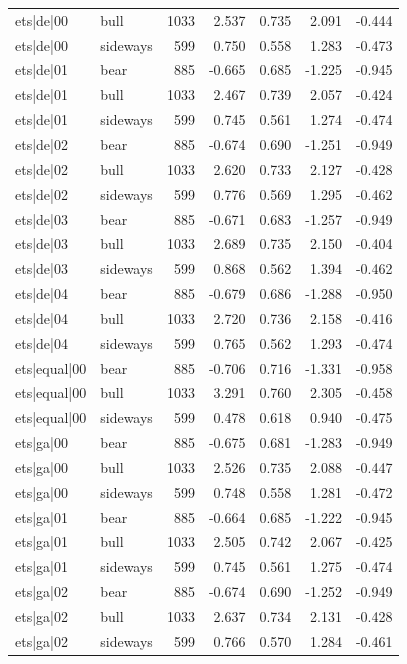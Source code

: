 \begin{table}
\begin{tabular}{llrrrrr}
ets|de|00 & bull & 1033 & 2.537 & 0.735 & 2.091 & -0.444 \\
ets|de|00 & sideways & 599 & 0.750 & 0.558 & 1.283 & -0.473 \\
ets|de|01 & bear & 885 & -0.665 & 0.685 & -1.225 & -0.945 \\
ets|de|01 & bull & 1033 & 2.467 & 0.739 & 2.057 & -0.424 \\
ets|de|01 & sideways & 599 & 0.745 & 0.561 & 1.274 & -0.474 \\
ets|de|02 & bear & 885 & -0.674 & 0.690 & -1.251 & -0.949 \\
ets|de|02 & bull & 1033 & 2.620 & 0.733 & 2.127 & -0.428 \\
ets|de|02 & sideways & 599 & 0.776 & 0.569 & 1.295 & -0.462 \\
ets|de|03 & bear & 885 & -0.671 & 0.683 & -1.257 & -0.949 \\
ets|de|03 & bull & 1033 & 2.689 & 0.735 & 2.150 & -0.404 \\
ets|de|03 & sideways & 599 & 0.868 & 0.562 & 1.394 & -0.462 \\
ets|de|04 & bear & 885 & -0.679 & 0.686 & -1.288 & -0.950 \\
ets|de|04 & bull & 1033 & 2.720 & 0.736 & 2.158 & -0.416 \\
ets|de|04 & sideways & 599 & 0.765 & 0.562 & 1.293 & -0.474 \\
ets|equal|00 & bear & 885 & -0.706 & 0.716 & -1.331 & -0.958 \\
ets|equal|00 & bull & 1033 & 3.291 & 0.760 & 2.305 & -0.458 \\
ets|equal|00 & sideways & 599 & 0.478 & 0.618 & 0.940 & -0.475 \\
ets|ga|00 & bear & 885 & -0.675 & 0.681 & -1.283 & -0.949 \\
ets|ga|00 & bull & 1033 & 2.526 & 0.735 & 2.088 & -0.447 \\
ets|ga|00 & sideways & 599 & 0.748 & 0.558 & 1.281 & -0.472 \\
ets|ga|01 & bear & 885 & -0.664 & 0.685 & -1.222 & -0.945 \\
ets|ga|01 & bull & 1033 & 2.505 & 0.742 & 2.067 & -0.425 \\
ets|ga|01 & sideways & 599 & 0.745 & 0.561 & 1.275 & -0.474 \\
ets|ga|02 & bear & 885 & -0.674 & 0.690 & -1.252 & -0.949 \\
ets|ga|02 & bull & 1033 & 2.637 & 0.734 & 2.131 & -0.428 \\
ets|ga|02 & sideways & 599 & 0.766 & 0.570 & 1.284 & -0.461 \\

\end{tabular}
\end{table}
